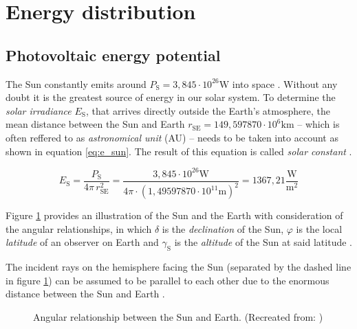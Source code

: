 \section{Energy distribution}

%
%
%


\subsection{Photovoltaic energy potential}

The Sun constantly emits around $P_{\mathrm{S}} = 3,845 \cdot 10^{26} \mathrm{W}$ into space \cite{Mertens:2015}. Without any doubt it is the greatest source of energy in our solar system. To determine the \emph{solar irradiance} $E_\mathrm{S}$, that arrives directly outside the Earth's atmosphere, the mean distance between the Sun and Earth $r_{\mathrm{SE}} = 149,597870 \cdot 10^{6} \mathrm{km}$ -- which is often reffered to as \emph{astronomical unit} (AU) -- needs to be taken into account as shown in equation \ref{eq:e_sun}. The result of this equation is called \emph{solar constant} \cite{Karttunen:2006, Mertens:2015, Wagner:2018}. 

\begin{center}
	\begin{equation} \label{eq:e_sun}
		E_{\mathrm{S}} = \frac{P_{\mathrm{S}}}{4 \pi \, r_{\mathrm{SE}}^2} = \frac{3,845 \cdot 10^{26} \mathrm{W}}{4 \pi \cdot (1,49597870 \cdot 10^{11} \mathrm{m})^2} = 1367,21 \frac{\mathrm{W}}{\mathrm{m}^2}
	\end{equation}
\end{center}

Figure \ref{fig:tikz_angular_relationship} provides an illustration of the Sun and the Earth with consideration of the angular relationships, in which $\delta$ is the \emph{declination} of the Sun, $\varphi$ is the local \emph{latitude} of an observer on Earth and $\gamma_{\mathrm{S}}$ is the \emph{altitude} of the Sun at said latitude \cite{Appelbaum:1993, Karttunen:2006, Mertens:2015, Wagner:2018}. 

The incident rays on the hemisphere facing the Sun (separated by the dashed line in figure \ref{fig:tikz_angular_relationship}) can be assumed to be parallel to each other due to the enormous distance between the Sun and Earth \cite{Mertens:2015, Wagner:2018}.

\begin{figure}[h!]
	\centering
	
	\caption{Angular relationship between the Sun and Earth. (Recreated from: \cite{Mertens:2015})}
	\label{fig:tikz_angular_relationship}
\end{figure} 

